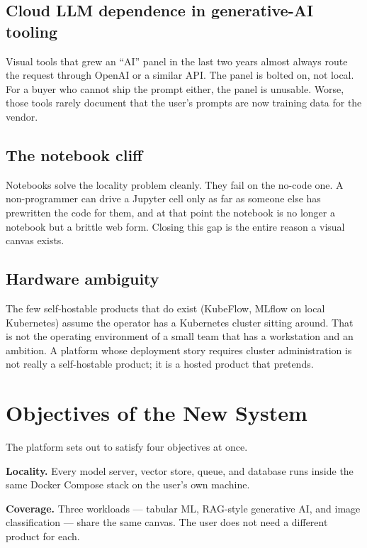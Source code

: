 \documentclass[12pt, a4paper, oneside]{report}
\begin{document}
\subsection{Cloud LLM dependence in generative-AI tooling}

Visual tools that grew an ``AI'' panel in the last two years almost
always route the request through OpenAI or a similar API. The panel
is bolted on, not local. For a buyer who cannot ship the prompt
either, the panel is unusable. Worse, those tools rarely document
that the user's prompts are now training data for the vendor.

\subsection{The notebook cliff}

Notebooks solve the locality problem cleanly. They fail on the
no-code one. A non-programmer can drive a Jupyter cell only as far
as someone else has prewritten the code for them, and at that point
the notebook is no longer a notebook but a brittle web form. Closing
this gap is the entire reason a visual canvas exists.

\subsection{Hardware ambiguity}

The few self-hostable products that do exist (KubeFlow, MLflow on
local Kubernetes) assume the operator has a Kubernetes cluster
sitting around. That is not the operating environment of a small
team that has a workstation and an ambition. A platform whose
deployment story requires cluster administration is not really a
self-hostable product; it is a hosted product that pretends.

\section{Objectives of the New System}

The platform sets out to satisfy four objectives at once.

\textbf{Locality.} Every model server, vector store, queue, and
database runs inside the same Docker Compose stack on the user's own
machine.

\textbf{Coverage.} Three workloads --- tabular ML, RAG-style
generative AI, and image classification --- share the same canvas.
The user does not need a different product for each.
\end{document}
